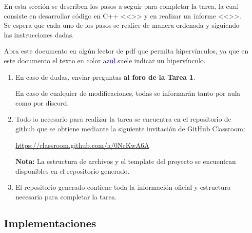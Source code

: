 En esta sección se describen los pasos a seguir para completar la tarea, la cual consiste en desarrollar código en C++ <<>> y en realizar un informe <<>>. Se espera que cada uno de los pasos se realice de manera ordenada y siguiendo las instrucciones dadas.

\begin{mdframed}
    Abra este documento en algún lector de pdf que permita hipervínculos, ya que en este documento el texto en color \textcolor{blue}{azul} suele indicar un hipervínculo.
\end{mdframed}

\begin{enumerate}[(1)]
    \item 
    En caso de dudas, enviar preguntas \textbf{al foro de la Tarea 1}. 
    
    En caso de cualquier de modificaciones, todas se informarán tanto por aula como por discord.
    
    \item Todo lo necesario para realizar la tarea se encuentra en el repositorio de github que se obtiene mediante la siguiente invitación de GitHub Classroom:
\begin{center}

    \url{https://classroom.github.com/a/0NcKwA6A}
        
\end{center}

\textbf{Nota:} La estructura de archivos y el template del proyecto se encuentran disponibles en el repositorio generado.

\item El repositorio generado contiene toda la información oficial y estructura necesaria para completar la tarea.
\end{enumerate}

\subsection{Implementaciones} \label{subsec:implementations}





